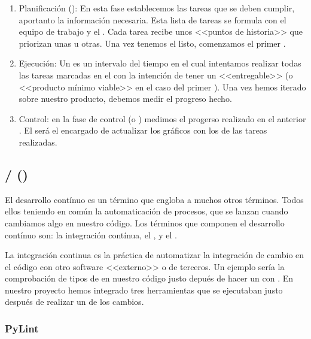 \begin{enumerate}
  \item Planificación (): En esta fase establecemos las tareas que se deben cumplir, aportanto la información necesaria. Esta lista de tareas se formula con el equipo de trabajo y el . Cada tarea recibe unos <<puntos de historia>> que priorizan unas u otras. Una vez tenemos el  listo, comenzamos el primer .

  \item Ejecución: Un  es un intervalo del tiempo en el cual intentamos realizar todas las tareas marcadas en el  con la intención de tener un <<entregable>> (o <<producto mínimo viable>> en el caso del primer ). Una vez hemos iterado sobre nuestro producto, debemos medir el progreso hecho.

  \item Control: en la fase de control (o ) medimos el progerso realizado en el anterior . El  será el encargado de actualizar los gráficos con los  de las tareas realizadas.
\end{enumerate}

\subsection{ /  ()}

El desarrollo contínuo es un término que engloba a muchos otros términos. Todos ellos teniendo en común la automaticación de procesos, que se lanzan cuando cambiamos algo en nuestro código. Los términos que componen el desarrollo contínuo son: la integración contínua, el ,  y el .

La integración continua es la práctica de automatizar la integración de cambio en el código con otro software <<externo>> o de terceros. Un ejemplo sería la comprobación de tipos de en nuestro código justo depués de hacer un  con . En nuestro proyecto hemos integrado tres herramientas que se ejecutaban justo después de realizar un  de los cambios.

\subsubsection{PyLint}

